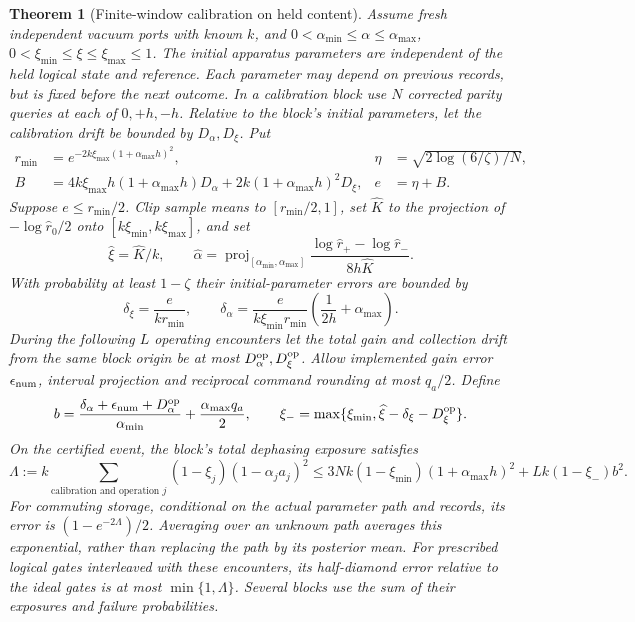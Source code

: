 \documentclass[11pt]{article}
\newtheorem{theorem}{Theorem}[section]
\theoremstyle{definition}
\theoremstyle{remark}
\begin{document}
\begin{theorem}[Finite-window calibration on held content]
\label{thm:continuing-body}
Assume fresh independent vacuum ports with known $k$, and
$0<\alpha_{\min}\le\alpha\le\alpha_{\max}$,
$0<\xi_{\min}\le\xi\le\xi_{\max}\le1$.
The initial apparatus parameters are independent of the held logical state
and reference. Each parameter may depend on previous records, but is fixed
before the next outcome. In a calibration block use $N$ corrected parity
queries at each of $0,+h,-h$. Relative to the block's initial parameters,
let the calibration drift be bounded by $D_\alpha,D_\xi$. Put
\begin{align*}
 r_{\min}&=e^{-2k\xi_{\max}(1+\alpha_{\max}h)^2},&
 \eta&=\sqrt{2\log(6/\zeta)/N},\\
 B&=4k\xi_{\max}h(1+\alpha_{\max}h)D_\alpha
       +2k(1+\alpha_{\max}h)^2D_\xi,& e&=\eta+B.
\end{align*}
Suppose $e\le r_{\min}/2$. Clip sample means to $[r_{\min}/2,1]$,
set $\widehat K$ to the projection of $-\log\widehat r_0/2$ onto
$[k\xi_{\min},k\xi_{\max}]$, and set
\[
 \widehat\xi=\widehat K/k,\qquad
 \widehat\alpha=\operatorname{proj}_{[\alpha_{\min},\alpha_{\max}]}
 \frac{\log\widehat r_+-\log\widehat r_-}{8h\widehat K}.
\]
With probability at least $1-\zeta$ their initial-parameter errors are bounded by
\[
 \delta_\xi=\frac{e}{kr_{\min}},\qquad
 \delta_\alpha=\frac{e}{k\xi_{\min}r_{\min}}
                       \left(\frac1{2h}+\alpha_{\max}\right).
\]
During the following $L$ operating encounters let the total gain and collection
drift from the same block origin be at most $D_\alpha^{\rm op},D_\xi^{\rm op}$.
Allow implemented gain error $\epsilon_{\rm num}$, interval projection and
reciprocal command rounding at most $q_a/2$. Define
\[
 b=\frac{\delta_\alpha+\epsilon_{\rm num}+D_\alpha^{\rm op}}
          {\alpha_{\min}}+\frac{\alpha_{\max}q_a}2,
 \qquad \xi_-=\max\{\xi_{\min},
                 \widehat\xi-\delta_\xi-D_\xi^{\rm op}\}.
\]
On the certified event, the block's total dephasing exposure satisfies
\begin{equation}
 \Lambda:=k\sum_{\text{calibration and operation }j}
                    (1-\xi_j)(1-\alpha_ja_j)^2
 \le 3Nk(1-\xi_{\min})(1+\alpha_{\max}h)^2
        +Lk(1-\xi_-)b^2.
 \label{eq:continuing-exposure}
\end{equation}
For commuting storage, conditional on the actual parameter path and records,
its error is $(1-e^{-2\Lambda})/2$. Averaging over an unknown path averages
this exponential, rather than replacing the path by its posterior mean.
For prescribed logical gates interleaved with these encounters, its
half-diamond error relative to the ideal gates is at most $\min\{1,\Lambda\}$.
Several blocks use the sum of their exposures and failure probabilities.
\end{theorem}
\end{document}
